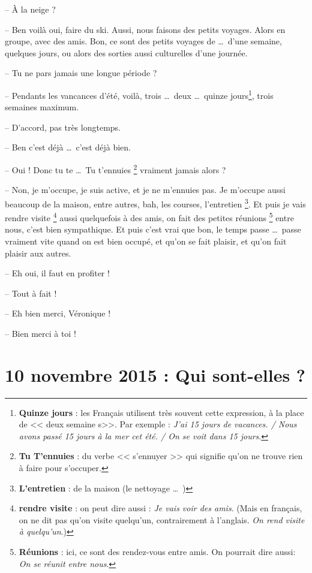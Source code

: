 \documentclass[11pt, french]{report}
\begin{document}
-- À la neige ?

-- Ben voilà oui, faire du ski. Aussi, nous faisons des petits voyages. Alors
en groupe, avec des amis. Bon, ce sont des petits voyages de \ldots\ d'une
semaine, quelques jours, ou alors des sorties aussi culturelles d'une journée.

-- Tu ne pars jamais une longue période ?

-- Pendants les vancances d'été, voilà, trois \ldots\ deux \ldots\ quinze
jours\footnote{\textbf{Quinze jours} : les Français utilisent très souvent
  cette expression, à la place de << deux semaine s>>. Par exemple :
  \textit{J'ai 15 jours de vacances. / Nous avons passé 15 jours à la mer
    cet été. / On se voit dans 15 jours}.}, trois semaines maximum.

-- D'accord, pas très longtemps.

-- Ben c'est déjà \ldots\ c'est déjà bien.

-- Oui ! Donc tu te \ldots\ Tu t'ennuies \footnote{\textbf{Tu T'ennuies} : du
  verbe << s'ennuyer >> qui signifie qu'on ne trouve rien à faire pour
  s'occuper.} vraiment jamais alors ?

-- Non, je m'occupe, je suis active, et je ne m'ennuies pas. Je m'occupe aussi
beaucoup de la maison, entre autres, bah, les courses, l'entretien
\footnote{\textbf{L'entretien} : de la maison (le nettoyage \ldots\ )}.
Et puis je vais rendre visite \footnote{\textbf{rendre visite} : on peut
  dire aussi : \textit{Je vais voir des amis}. (Mais en français, on ne dit pas
  qu'on visite quelqu'un, contrairement à l'anglais. \textit{On rend visite
    à quelqu'un}.)} aussi quelquefois à des amis, on fait des petites
réunions \footnote{\textbf{Réunions} : ici, ce sont des rendez-vous entre
  amis. On pourrait dire aussi: \textit{On se réunit entre nous}.} entre nous,
c'est bien sympathique. Et puis c'est vrai que bon, le temps passe \ldots\
passe vraiment vite quand on est bien occupé, et qu'on se fait plaisir, et qu'on
fait plaisir aux autres.

-- Eh oui, il faut en profiter !

-- Tout à fait !

-- Eh bien merci, Véronique !

-- Bien merci à toi !

\chapter{10 novembre 2015 : Qui sont-elles ?}
\end{document}
